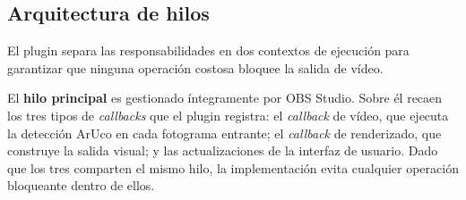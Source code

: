  
\subsection{Arquitectura de hilos}
\label{subsec:hilos}
 
El plugin separa las responsabilidades en dos contextos de ejecución para garantizar que ninguna
operación costosa bloquee la salida de vídeo.
 
El \textbf{hilo principal} es gestionado íntegramente por OBS Studio. Sobre él recaen los tres
tipos de \textit{callbacks} que el plugin registra: el \textit{callback} de vídeo, que ejecuta la
detección ArUco en cada fotograma entrante; el \textit{callback} de renderizado, que construye la salida
visual; y las actualizaciones de la interfaz de usuario. Dado que los tres comparten el mismo
hilo, la implementación evita cualquier operación bloqueante dentro de ellos.
 
